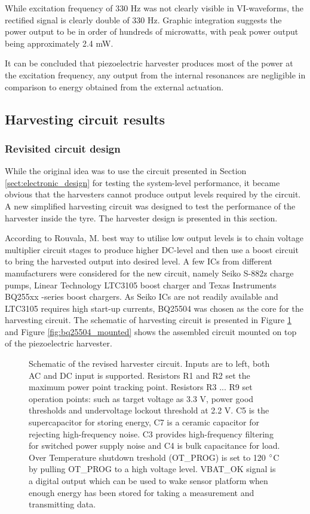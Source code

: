 While excitation frequency of 330 Hz was not clearly visible in VI-waveforms, the rectified signal is clearly double of 330 Hz. Graphic integration suggests the power output to be in order of hundreds of microwatts, with peak power output being approximately 2.4 mW. 

It can be concluded that piezoelectric harvester produces most of the power at the excitation frequency, any output from the internal resonances are negligible in comparison to energy obtained from the external actuation.

\subsection{Harvesting circuit results}
\subsubsection{Revisited circuit design}\label{sect:BQ25504_schematic}
While the original idea was to use the circuit presented in Section \ref{sect:electronic_design} for testing the system-level performance, it became obvious that the harvesters cannot produce output levels required by the circuit. A new simplified harvesting circuit was designed to test the performance of the harvester inside the tyre. The harvester design is presented in this section.

According to Rouvala, M. \cite{Rouvala2015} best way to utilise low output levels is to chain voltage multiplier circuit stages to produce higher DC-level and then use a boost circuit to bring the harvested output into desired level. A few ICs from different manufacturers were considered for the new circuit, namely Seiko S-882z \cite{SeikoInstruments2010} charge pumps, Linear Technology LTC3105 \cite{ltc3015} boost charger and Texas Instruments BQ255xx -series boost chargers. As Seiko ICs are not readily available and LTC3105 requires high start-up currents, BQ25504 \cite{bq25504} was chosen as the core for the harvesting circuit. The schematic of harvesting circuit is presented in Figure \ref{fig:bq25504} and Figure \ref{fig:bq25504_mounted} shows the assembled circuit mounted on top of the piezoelectric harvester.


\begin{figure}[htb]
    \centering
    \def\svgwidth{\columnwidth}
    
    \caption{\label{fig:bq25504} Schematic of the revised harvester circuit. Inputs are to left, both AC and DC input is supported. Resistors R1 and R2 set the maximum power point tracking point. Resistors R3 ... R9 set operation points: such as target voltage as 3.3 V, power good thresholds and undervoltage lockout threshold at 2.2 V. C5 is the supercapacitor for storing energy, C7 is a ceramic capacitor for rejecting high-frequency noise. C3 provides high-frequency filtering for switched power supply noise and C4 is bulk capacitance for load. Over Temperature shutdown treshold (OT\_PROG) is set to 120 $\degree$C by pulling OT\_PROG to a high voltage level. VBAT\_OK signal is a digital output which can be used to wake sensor platform when enough energy has been stored for taking a measurement and transmitting data.}
\end{figure}

